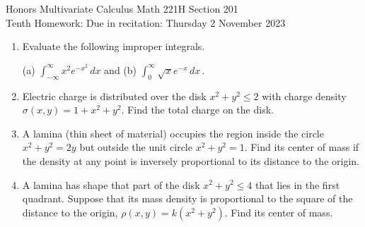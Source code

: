 \documentclass[12pt]{article}
\begin{document}
\LARGE 
\noindent
{\color{Maroon}Honors Multivariate Calculus \hfill Math 221H Section 201}\vspace{2pt}\\
\large
Tenth Homework:\hfill 
Due in recitation: Thursday 2 November 2023\vspace{2pt}

\normalsize
    \vspace{2pt}

\begin{enumerate}



\item Evaluate the following improper integrals.

  (a) ${\displaystyle \int_{-\infty}^\infty x^2 e^{-x^2}\, dx}$
  \qquad and \qquad
  (b) ${\displaystyle \int_0^\infty \sqrt{x} e^{-x}\, dx}$\,.
  
\vspace{-2pt}
   
\item Electric charge is distributed over the disk $x^2+y^2\leq 2$ with charge density $\sigma(x,y)=1+x^2+y^2$.
  Find the total charge on the disk.
\vspace{-2pt}
   


\item A lamina (thin sheet of material) occupies the region inside the circle $x^2+y^2=2y$ but outside the unit circle
  $x^2+y^2=1$.
  Find its center of mass if the density at any point is inversely proportional to its distance to the origin.
\vspace{-2pt}
   



\item A lamina  has shape that part of the disk $x^2+y^2\leq 4$ that lies in the first quadrant.
  Suppose that its mass density is proportional to the square of the distance to the origin, $\rho(x,y)=k(x^2+y^2)$.
  Find its center of mass.
\vspace{-2pt}
   


\end{enumerate}
\end{document}
